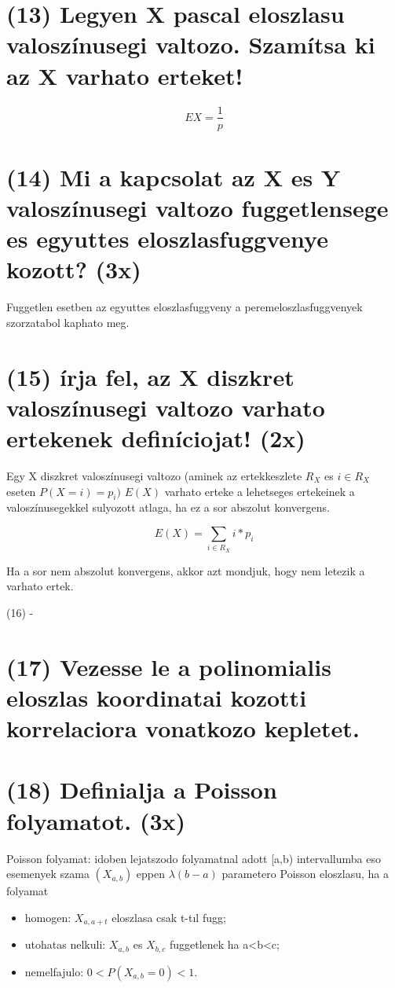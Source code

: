 \documentclass[12p]{article}
\begin{document}
\section{(13) Legyen X pascal eloszlasu valoszínusegi valtozo. Szamítsa ki az X varhato erteket!}

$$EX = \frac{1}{p}$$

\section{(14) Mi a kapcsolat az X es Y valoszínusegi valtozo fuggetlensege es egyuttes eloszlasfuggvenye kozott? (3x)}

Fuggetlen esetben az egyuttes eloszlasfuggveny a peremeloszlasfuggvenyek szorzatabol kaphato meg.

\section{(15) írja fel, az X diszkret valoszínusegi valtozo varhato ertekenek definíciojat! (2x)}

Egy X diszkret valoszínusegi valtozo (aminek az ertekkeszlete
$R_X$ es $i \in R_X$ eseten $P(X = i) = p_i)$ $E(X)$ varhato erteke a lehetseges ertekeinek a valoszínusegekkel sulyozott atlaga, ha ez a sor abszolut konvergens.

$$E(X) = \sum_{i \in R_X} i * p_i$$

Ha a sor nem abszolut konvergens, akkor azt mondjuk, hogy nem letezik a varhato ertek.

(16) -

\section{(17) Vezesse le a polinomialis eloszlas koordinatai kozotti korrelaciora vonatkozo kepletet.}

\section{(18) Definialja a Poisson folyamatot. (3x)}

Poisson folyamat: idoben lejatszodo folyamatnal adott [a,b) intervallumba eso esemenyek szama $(X_{a,b})$ eppen $\lambda(b-a)$ parametero Poisson eloszlasu, ha a folyamat

\begin{itemize}
	\item homogen: $X_{a,a+t}$ eloszlasa csak t-tıl fugg;
	\item utohatas nelkuli: $X_{a,b}$ es $X_{b,c}$ fuggetlenek ha a<b<c;
	\item nemelfajulo: $0<P (X_{a,b}=0)<1$.

\end{itemize}
\end{document}
